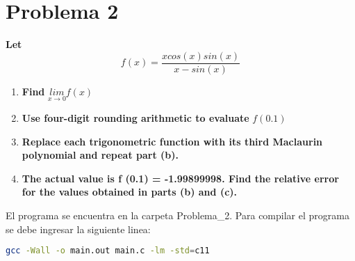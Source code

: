\section*{Problema 2}
\textbf{Let}
\begin{equation}
      f(x) = \frac{xcos(x)sin(x)}{x-sin(x)}
      \label{eq:problem2fx}
\end{equation}
\begin{enumerate}
      \item \textbf{Find} $\underset{x\rightarrow 0}{lim} f(x)$

            
      \item \textbf{Use four-digit rounding arithmetic to evaluate} $f(0.1)$

            
      \item \textbf{Replace each trigonometric function with its third Maclaurin polynomial and repeat part (b).}

            
      \item \textbf{The actual value is f (0.1) = -1.99899998. Find the relative error for the values obtained in parts (b) and (c).}

            
\end{enumerate}

El programa se encuentra en la carpeta \textcolor{citecolor}{Problema\_2}. Para compilar el programa se debe ingresar la siguiente linea:
\begin{lstlisting}[language=bash]
    gcc -Wall -o main.out main.c -lm -std=c11    
\end{lstlisting}